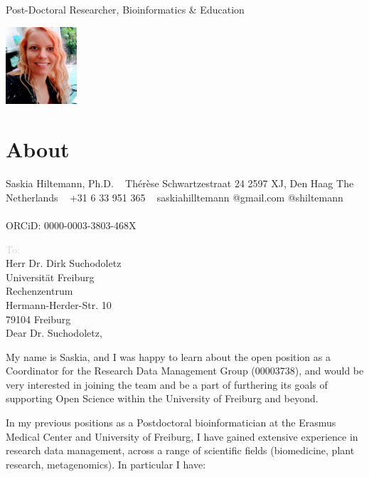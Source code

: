 \documentclass[]{shiltemann-cv}
\begin{document}
    {Post-Doctoral Researcher, Bioinformatics \& Education}

\begin{aside}
  \includegraphics[width=75pt]{photo-saskia.png}
  \section{About}
    Saskia Hiltemann, Ph.D.
    ~
    Thérèse Schwartzestraat 24
    2597 XJ, Den Haag
    The Netherlands
    ~
    +31 6 33 951 365 \faPhone
    ~
    saskiahilltemann @gmail.com \faEnvelope
    @shiltemann \faGithub \ \faTwitter \ \faLinkedin
    \ \\
    ORCiD:
    0000-0003-3803-468X \faOrcid
\end{aside}

\textcolor{lightgray}{To:} \\
\color{black}
Herr Dr. Dirk Suchodoletz \\
Universität Freiburg \\
Rechenzentrum \\
Hermann-Herder-Str. 10 \\
79104 Freiburg \\


Dear Dr. Suchodoletz,

My name is Saskia, and I was happy to learn about the open position as a Coordinator for the Research Data Management Group (00003738), and would be very interested in joining the team and be a part of furthering its goals of supporting Open Science within the University of Freiburg and beyond.

In my previous positions as a Postdoctoral bioinformatician at the Erasmus Medical Center and University of Freiburg, I have gained extensive experience in research data management, across a range of scientific fields (biomedicine, plant research, metagenomics). In particular I have:
\end{document}
